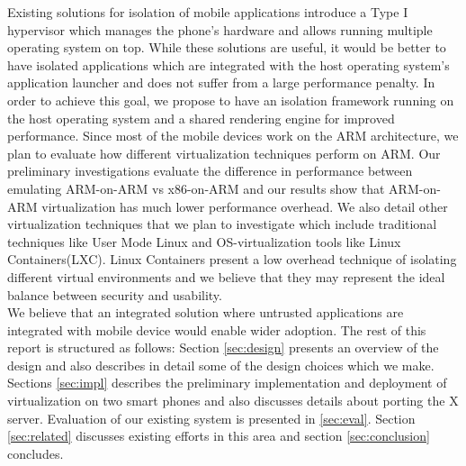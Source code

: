 Existing solutions for isolation of mobile applications introduce a Type I hypervisor \cite{mvp, okl4} which manages the phone's hardware and allows running multiple operating system on top. While these solutions are useful, it would be better to have isolated applications which are integrated with the host operating system's application launcher and does not suffer from a large performance penalty. In order to achieve this goal, we propose to have an isolation framework running on the host operating system and a shared rendering engine for improved performance. Since most of the mobile devices work on the ARM architecture, we plan to evaluate how different virtualization techniques perform on ARM. Our preliminary investigations evaluate the difference in performance between emulating ARM-on-ARM vs x86-on-ARM and our results show that ARM-on-ARM virtualization has much lower performance overhead. We also detail other virtualization techniques that we plan to investigate which include traditional techniques like User Mode Linux and OS-virtualization tools like Linux Containers(LXC). Linux Containers present a low overhead technique of isolating different virtual environments and we believe that they may represent the ideal balance between security and usability.\\

We believe that an integrated solution where untrusted applications are integrated with mobile device would enable wider adoption. The rest of this report is structured as follows: Section \ref{sec:design} presents an overview of the design and also describes in detail some of the design choices which we make. Sections \ref{sec:impl} describes the preliminary implementation and deployment of virtualization on two smart phones and also discusses details about porting the X server. Evaluation of our existing system is presented in \ref{sec:eval}. Section \ref{sec:related} discusses existing efforts in this area and section \ref{sec:conclusion} concludes.
